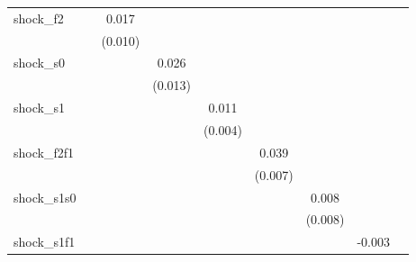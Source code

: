 {\begin{tabular}{l*{8}{c}}
\addlinespace
shock\_f2    &                     &       0.017         &                     &                     &                     &                     &                     &                     \\
            &                     &     (0.010)         &                     &                     &                     &                     &                     &                     \\
\addlinespace
shock\_s0    &                     &                     &       0.026\sym{*}  &                     &                     &                     &                     &                     \\
            &                     &                     &     (0.013)         &                     &                     &                     &                     &                     \\
\addlinespace
shock\_s1    &                     &                     &                     &       0.011\sym{***}&                     &                     &                     &                     \\
            &                     &                     &                     &     (0.004)         &                     &                     &                     &                     \\
\addlinespace
shock\_f2f1  &                     &                     &                     &                     &       0.039\sym{***}&                     &                     &                     \\
            &                     &                     &                     &                     &     (0.007)         &                     &                     &                     \\
\addlinespace
shock\_s1s0  &                     &                     &                     &                     &                     &       0.008         &                     &                     \\
            &                     &                     &                     &                     &                     &     (0.008)         &                     &                     \\
\addlinespace
shock\_s1f1  &                     &                     &                     &                     &                     &                     &      -0.003         &                     \\

\end{tabular}}
